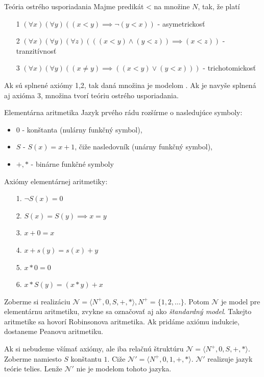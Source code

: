 \begin{priklad}{Teória ostrého usporiadania}
    Majme predikát < na množine $N$, tak, že platí
    \begin{itemize}
    \item[1] $(\forall x)(\forall y) ((x < y) \implies \neg (y < x))$
    - asymetrickosť
    \item[2] $(\forall x)(\forall y)(\forall z) (((x<y) \land (y<z)) \implies
        (x<z))$ - tranzitívnosť
    \item[3] $(\forall x)(\forall y)( (x\not=y) \implies ((x<y) \lor (y<x)))$ -
     trichotomickosť
    \end{itemize}
    Ak sú splnené axiómy 1,2, tak daná množina je modelom \fixme{}. Ak je
    navyše splnená aj axióma 3, množina tvorí teóriu ostrého
    usporiadania.
\end{priklad}

\begin{priklad}{Elementárna aritmetika}
    Jazyk prvého rádu rozšírme o nasledujúce symboly:
    \begin{itemize}
        \item $0$ - konštanta (nulárny funkčný symbol),
        \item $S$ - $S(x)=x+1$, čiže nasledovník (unárny funkčný symbol),
        \item $+,*$ - binárne funkčné symboly
    \end{itemize}
    Axiómy elementárnej aritmetiky:
    \begin{itemize}
        \item[1.] $\neg S(x) = 0$
        \item[2.] $S(x) = S(y) \implies x=y$
        \item[3.] $x+0 = x$
        \item[4.] $x+s(y) = s(x) + y$
        \item[5.] $x * 0 = 0$
        \item[6.] $x * S(y) = (x*y)+x$
    \end{itemize}
    Zoberme si realizáciu 
        $\mathcal{N}=\langle N^+,0,S,+,* \rangle, N^+ =
        \{1,2,\dots\}$.
        Potom $\mathcal{N}$ je model pre elementárnu aritmetiku,
        zvykne sa označovať aj ako \emph{štandardný model}.
        Takejto aritmetike sa hovorí Robinsonova aritmetika.
        Ak pridáme axiómu indukcie, dostaneme Peanovu aritmetiku.
\end{priklad}

\begin{poznamka}
    Ak si nebudeme všímať axiómy, ale iba relačnú štruktúru
    $\mathcal{N}=\langle N^+,0,S,+,* \rangle$.
    Zoberme namiesto $S$ konštantu $1$.
    Ciže $\mathcal{N}'=\langle N^+,0,1,+,* \rangle$.
    $\mathcal{N}'$ realizuje jazyk teórie telies.
    Lenže $\mathcal{N}'$ nie je modelom tohoto jazyka. 
\end{poznamka}

